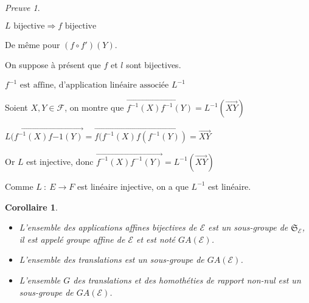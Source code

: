 \documentclass[]{article}
\newtheorem{mycor}{Corollaire}
\theoremstyle{remark}
\newtheorem{myproof}{Preuve}
\theoremstyle{definition}
\newcommand{\funcshort}[3]{
#1 ~ : ~ #2 \longrightarrow #3
}
\newenvironment{proofpart}[1]{
	\noindent
	{\textbf{\boldmath #1}}
}{
	\checkmark
}
\begin{document}
\begin{myproof}
\begin{enumerate}
\begin{proofpart}{$L \text{ bijective} \Longrightarrow f \text{ bijective}$}
			De même pour $(f \circ f')(Y)$.
		\end{proofpart}

		On suppose à présent que $f$ et $l$ sont bijectives.

		\begin{proofpart}{$f^{-1} \text{ est affine, d'application linéaire associée } L^{-1}$}
		
		Soient $X, Y \in \mathcal{F}$, on montre que $\overrightarrow{f^{-1}(X)f^{-1}(Y)} = L^{-1}(\overrightarrow{XY})$
		
		$L(\overrightarrow{f^{-1}(X)f{-1}(Y)} = \overrightarrow{f(f^{-1}(X) f(f^{-1}(Y))} = \overrightarrow{XY}$
		
		Or $L$ est injective, donc $\overrightarrow{f^{-1}(X)f^{-1}(Y)} = L^{-1}(\overrightarrow{XY})$
		
		Comme $\funcshort{L}{E}{F}$ est linéaire injective, on a que $L^{-1}$ est linéaire.

		\end{proofpart}		
	\end{enumerate}
\end{myproof}

\begin{mycor}
	\leavevmode
	\begin{itemize}
		\item L'ensemble des applications affines bijectives de $\mathcal{E}$ est un sous-groupe de $\mathfrak{S}_{\mathcal{E}}$, il est appelé \textit{groupe affine de $\mathcal{E}$} et est noté $GA(\mathcal{E})$.
		
		\item L'ensemble des translations est un sous-groupe de $GA(\mathcal{E})$.
		
		\item L'ensemble $G$ des translations et des homothéties de rapport non-nul est un sous-groupe de $GA(\mathcal{E})$.
	\end{itemize}
\end{mycor}
\end{document}
